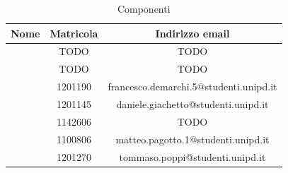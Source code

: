 \renewcommand{\arraystretch}{1}
	\begin{table}[H]
		\begin{center}
			\setlength{\aboverulesep}{0pt}
			\setlength{\belowrulesep}{0pt}
			\setlength{\extrarowheight}{.75ex}
			\begin{tabular}{ c c c }
				\rowcolor{AzzurroGruppo!30} 
				\textbf{Nome} & \textbf{Matricola} & \textbf{Indirizzo email}\\
				\toprule
				
				\Davide{} & TODO & TODO \\
				\Giosue{} & TODO & TODO \\
				\Francesco{} & 1201190 & francesco.demarchi.5@studenti.unipd.it \\
				\Daniele{} & 1201145 & daniele.giachetto@studenti.unipd.it \\
				\Lucrezia{} & 1142606 & TODO \\
				\Matteo{} & 1100806 & matteo.pagotto.1@studenti.unipd.it \\
				\Tommaso{} & 1201270 & tommaso.poppi@studenti.unipd.it \\
				
				\bottomrule
			\end{tabular}
			\caption{Componenti}
		\end{center}
    \end{table}